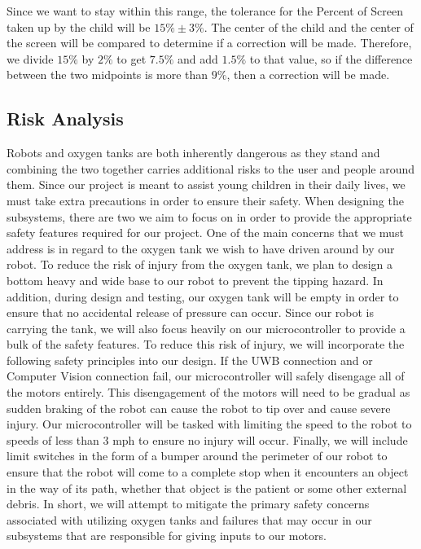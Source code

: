 \documentclass[journal,onecolumn, draftclsnofoot, 12pt]{IEEEtran}
\begin{document}
Since we want to stay within this range, the tolerance for the Percent of Screen taken up by the child will be \(15\% \pm 3\%\). 
The center of the child and the center of the screen will be compared to determine if a correction will be made. Therefore, we divide \( 15\% \) by \( 2\% \) to get \( 7.5\% \) and add \( 1.5\% \) to that value, so if the difference between the two midpoints is more than \( 9\% \), then a correction will be made.

\subsection{Risk Analysis}

Robots and oxygen tanks are both inherently dangerous as they stand and combining the two together carries additional risks to the user and people around them. Since our project is meant to assist young children in their daily lives, we must take extra precautions in order to ensure their safety. When designing the subsystems, there are two we aim to focus on in order to provide the appropriate safety features required for our project. One of the main concerns that we must address is in regard to the oxygen tank we wish to have driven around by our robot. To reduce the risk of injury from the oxygen tank, we plan to design a bottom heavy and wide base to our robot to prevent the tipping hazard. In addition, during design and testing, our oxygen tank will be empty in order to ensure that no accidental release of pressure can occur. Since our robot is carrying the tank, we will also focus heavily on our microcontroller to provide a bulk of the safety features. To reduce this risk of injury, we will incorporate the following safety principles into our design. If the UWB connection and or Computer Vision connection fail, our microcontroller will safely disengage all of the motors entirely. This disengagement of the motors will need to be gradual as sudden braking of the robot can cause the robot to tip over and cause severe injury. Our microcontroller will be tasked with limiting the speed to the robot to speeds of less than 3 mph to ensure no injury will occur. Finally, we will include limit switches in the form of a bumper around the perimeter of our robot to ensure that the robot will come to a complete stop when it encounters an object in the way of its path, whether that object is the patient or some other external debris. In short, we will attempt to mitigate the primary safety concerns associated with utilizing oxygen tanks and failures that may occur in our subsystems that are responsible for giving inputs to our motors. 
\end{document}
